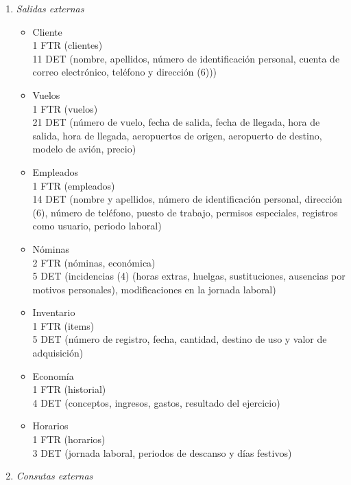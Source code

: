 \begin{enumerate}
	\item \textit{Salidas externas}

		\begin{itemize}
			\item Cliente \\
			1 FTR (clientes)\\
			11 DET (nombre, apellidos, número de identificación personal, cuenta de correo electrónico, teléfono y dirección (6)))\\
			\item Vuelos \\
			1 FTR (vuelos)\\
			21 DET (número de vuelo, fecha de salida, fecha de llegada, hora de salida, hora de llegada, aeropuertos de origen,
			aeropuerto de destino, modelo de avión, precio)\\
			\item Empleados \\
			1 FTR (empleados)\\
			14 DET (nombre y apellidos, número de identificación personal, dirección (6), número de teléfono, puesto de trabajo,
			permisos especiales, registros como usuario, periodo laboral)\\
			\item Nóminas \\
			2 FTR (nóminas, económica)\\
			5 DET (incidencias (4) (horas extras, huelgas, sustituciones, ausencias por motivos personales), modificaciones en la
			jornada laboral)\\
			\item Inventario \\
			1 FTR (items)\\
			5 DET (número de registro, fecha, cantidad, destino de uso y valor de adquisición)\\
			\item Economía \\
			1 FTR (historial)\\
			4 DET (conceptos, ingresos, gastos, resultado del ejercicio)\\
			\item Horarios \\
			1 FTR (horarios)\\
			3 DET (jornada laboral, periodos de descanso y días festivos)\\
		\end{itemize}

	\item \textit{Consutas externas}


\end{enumerate}
